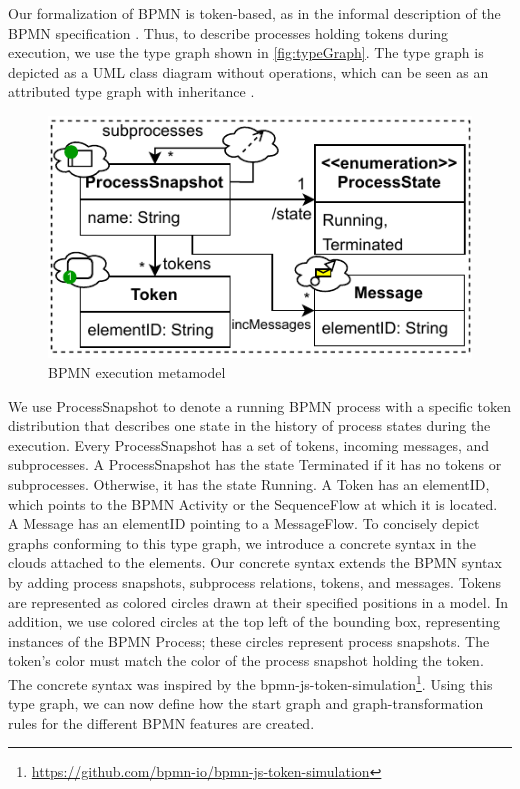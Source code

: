 \documentclass[runningheads]{llncs}
\begin{document}
Our formalization of BPMN is token-based, as in the informal description of the BPMN specification \cite{objectmanagementgroupBusinessProcessModel2013}.
Thus, to describe processes holding tokens during execution, we use the type graph shown in \autoref{fig:typeGraph}.
The type graph is depicted as a UML class diagram without operations, which can be seen as an attributed type graph with inheritance \cite{heckelGraphTransformationSoftware2020}.

\begin{figure}[ht]
  \centering
  \includegraphics[width=0.5\linewidth]{images/bpmn_semantics-typegraph.pdf}
  \caption{BPMN execution metamodel}
  \label{fig:typeGraph}
\end{figure}

We use \textsf{ProcessSnapshot} to denote a running BPMN process with a specific token distribution that describes one state in the history of process states during the execution.
Every \textsf{ProcessSnapshot} has a set of \textsf{tokens}, incoming \textsf{messages}, and \textsf{subprocesses}.
A \textsf{ProcessSnapshot} has the state \textsf{Terminated} if it has no \textsf{tokens} or \textsf{subprocesses}.
Otherwise, it has the state \textsf{Running}.
A \textsf{Token} has an \textsf{elementID}, which points to the BPMN \textsf{Activity} or the \textsf{SequenceFlow} at which it is located.
A \textsf{Message} has an \textsf{elementID} pointing to a \textsf{MessageFlow}.
To concisely depict graphs conforming to this type graph, we introduce a concrete syntax in the clouds attached to the elements.
Our concrete syntax extends the BPMN syntax by adding process snapshots, subprocess relations, tokens, and messages.
Tokens are represented as colored circles drawn at their specified positions in a model.
In addition, we use colored circles at the top left of the bounding box, representing instances of the BPMN \textsf{Process}; these circles represent process snapshots.
The token's color must match the color of the process snapshot holding the token.
The concrete syntax was inspired by the bpmn-js-token-simulation\footnote{\url{https://github.com/bpmn-io/bpmn-js-token-simulation}}.
Using this type graph, we can now define how the start graph and graph-transformation rules for the different BPMN features are created.
\end{document}
